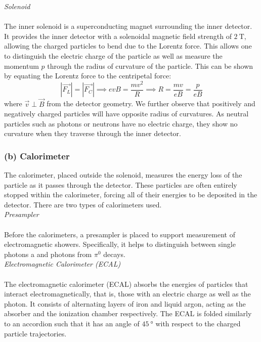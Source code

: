 \documentclass[a4paper]{report}
\numberwithin{equation}{section}
\begin{document}
\noindent \textit{Solenoid} \\ \\ 
The inner solenoid is a superconducting magnet surrounding the inner detector. It provides the inner detector with a solenoidal magnetic field strength of 
$\SI{2}{\tesla}$, allowing the charged particles to bend due to the Lorentz force. This allows one to distinguish the electric charge of the particle 
as well as measure the momentum $p$ through the radius of curvature of the particle. This can be shown by equating the Lorentz force to the 
centripetal force:
\begin{equation}
	|\vec{F_L}| = |\vec{F_C}| \implies evB = \frac{mv^2}{R} \implies R = \frac{mv}{eB} = \frac{p}{eB}
	\label{eq:rad_curvature}
\end{equation}
where $\vec{v} \perp \vec{B}$ from the detector geometry. We further observe that positively and negatively charged particles will have 
opposite radius of curvatures. As neutral particles such as photons or neutrons 
have no electric charge, they show no curvature when they traverse through the inner detector. 

\subsubsection{(b) Calorimeter}

The calorimeter, placed outside the solenoid, measures the energy loss of the particle as it passes through the detector. These particles are often entirely stopped 
within the calorimeter, forcing all of their energies to be deposited in the detector. There are two types of calorimeters used. \\

\noindent \textit{Presampler} \\ \\
Before the calorimeters, a presampler is placed to support measurement of electromagnetic showers. Specifically, it helps to distinguish between single photons a
and photons from $\pi^0$ decays. \\ 

\noindent \textit{Electromagnetic Calorimeter (ECAL)}\\ \\
The electromagnetic calorimeter (ECAL) absorbs the energies of particles that interact electromagnetically, that is, those with an electric charge as well as the photon. 
It consists of alternating layers of iron and liquid argon, acting as the absorber and the ionization chamber respectively. The ECAL is folded similarly to 
an accordion such that it has an angle of $\SI{45}{\degree}$ with respect to the charged particle trajectories.  \par 
\end{document}
